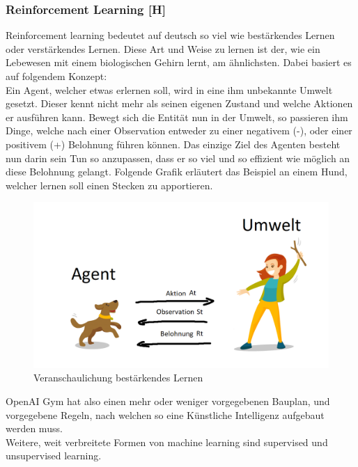 \subsubsection{Reinforcement Learning [H]}\label{tech:reinfLearning:header}
Reinforcement learning bedeutet auf deutsch so viel wie bestärkendes Lernen oder verstärkendes Lernen.
Diese Art und Weise zu lernen ist der, wie ein Lebewesen mit einem biologischen Gehirn
lernt, am ähnlichsten.
Dabei basiert es auf folgendem Konzept: \\
Ein Agent, welcher etwas erlernen soll, wird in eine ihm unbekannte Umwelt gesetzt. Dieser kennt nicht mehr
als seinen eigenen Zustand und welche Aktionen er ausführen kann. Bewegt sich die Entität nun in der
Umwelt, so passieren ihm Dinge, welche nach einer Observation entweder zu einer negativem (-), oder einer
positivem (+) Belohnung führen können. Das einzige Ziel des Agenten besteht nun darin sein Tun so anzupassen, dass
er so viel und so
effizient wie möglich an diese Belohnung gelangt. Folgende Grafik erläutert das Beispiel an einem Hund,
welcher lernen soll einen Stecken zu apportieren.

\begin{figure}[H]
    \centering
    \includegraphics[scale=0.6]{pics/reinforcementLearningConcept.png}
    \caption{Veranschaulichung bestärkendes Lernen}
    \label{tech:fig:reinfconcept}
\end{figure}

OpenAI Gym hat also einen mehr oder weniger vorgegebenen Bauplan, und vorgegebene Regeln, nach welchen
so eine Künstliche Intelligenz aufgebaut werden muss. \\
Weitere, weit verbreitete Formen von machine learning sind supervised und unsupervised learning.

